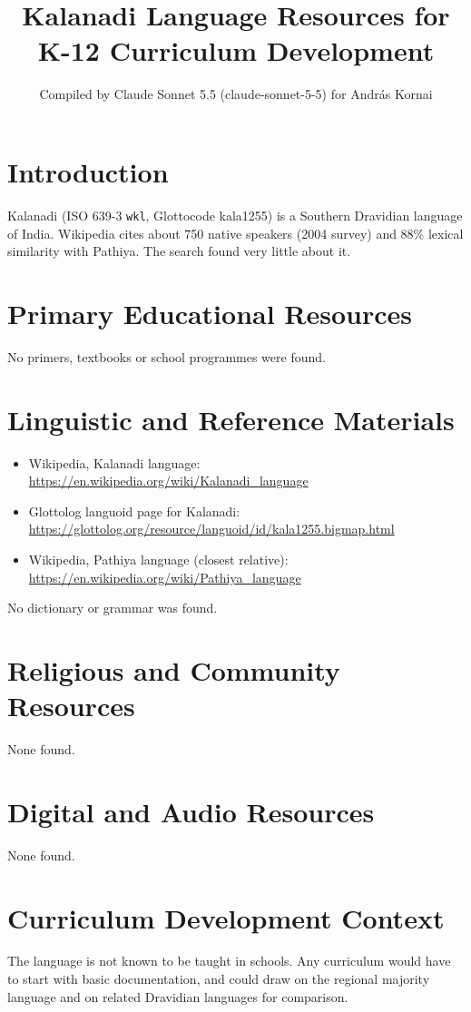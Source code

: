 \documentclass[12pt]{article}
\title{Kalanadi Language Resources for K-12 Curriculum Development}
\author{Compiled by Claude Sonnet 5.5 (claude-sonnet-5-5) for Andr\'as Kornai}
\date{}
\begin{document}
\maketitle

\section{Introduction}
Kalanadi (ISO 639-3 \texttt{wkl}, Glottocode kala1255) is a Southern Dravidian language of India. Wikipedia cites about 750 native speakers (2004 survey) and 88\% lexical similarity with Pathiya. The search found very little about it.

\section{Primary Educational Resources}
No primers, textbooks or school programmes were found.

\section{Linguistic and Reference Materials}
\begin{itemize}
\item Wikipedia, Kalanadi language: \url{https://en.wikipedia.org/wiki/Kalanadi_language}
\item Glottolog languoid page for Kalanadi: \url{https://glottolog.org/resource/languoid/id/kala1255.bigmap.html}
\item Wikipedia, Pathiya language (closest relative): \url{https://en.wikipedia.org/wiki/Pathiya_language}
\end{itemize}
No dictionary or grammar was found.

\section{Religious and Community Resources}
None found.

\section{Digital and Audio Resources}
None found.

\section{Curriculum Development Context}
The language is not known to be taught in schools. Any curriculum would have to start with basic documentation, and could draw on the regional majority language and on related Dravidian languages for comparison.
\end{document}
